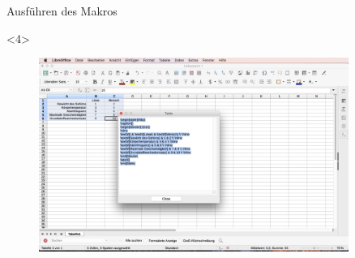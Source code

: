 \documentclass["WS\space 16-17\space -\space LaTeX-Kurs\space -\space Praesentation\space -\space 2.tex"]{subfiles}
\begin{document}
\begin{frame}[c]{Ausführen des Makros}
\begin{onlyenv}
\begin{figure}[htbp]
		\end{figure}
	\end{onlyenv}
	\begin{onlyenv}
		\begin{figure}[htbp]
			\centering
			\includegraphics[width=0.9\textwidth]{img/Bildschirmfoto_mitKasten/3_Tabelle/7.jpg}
		\end{figure}
	\end{onlyenv}
\end{frame}
\end{document}
